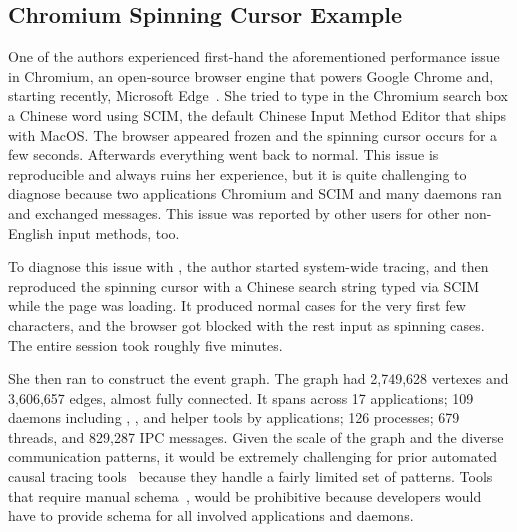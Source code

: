 \subsection{Chromium Spinning Cursor Example}


One of the authors experienced first-hand the aforementioned performance issue
in Chromium, an open-source browser engine that powers Google Chrome and,
starting recently, Microsoft Edge~\cite{chromiumurl}.  She tried to type in the
Chromium search box a Chinese word using SCIM, the default Chinese Input Method
Editor that ships with MacOS.  The browser appeared frozen and the spinning
cursor occurs for a few seconds.  Afterwards everything went back to normal.
This issue is reproducible and always ruins her experience, but it is quite
challenging to diagnose because two applications Chromium and SCIM and many
daemons ran and exchanged messages.  This issue was reported by other users for
other non-English input methods, too.

To diagnose this issue with \xxx, the author started system-wide tracing, and
then reproduced the spinning cursor with a Chinese search string typed via SCIM
while the page was loading. It produced normal cases for the very first few
characters, and the browser got blocked with the rest input as spinning cases.
The entire session took roughly five minutes.

She then ran \xxx to construct the event graph. The graph had 2,749,628 vertexes
and 3,606,657 edges, almost fully connected. It spans across 17 applications;
109 daemons including , ,  and
helper tools by applications; 126 processes; 679 threads, and 829,287
IPC messages. Given the scale of the graph and the diverse communication
patterns, it would be extremely challenging for prior automated causal tracing
tools~\cite{aguilera2003performance, zhang2013panappticon, attariyan2012x,
cohen2004correlating} because they handle a fairly limited set of patterns.
Tools that require manual schema~\cite{barham2004using, reynolds2006pip}, would
be prohibitive because developers would have to provide schema for all involved
applications and daemons.


